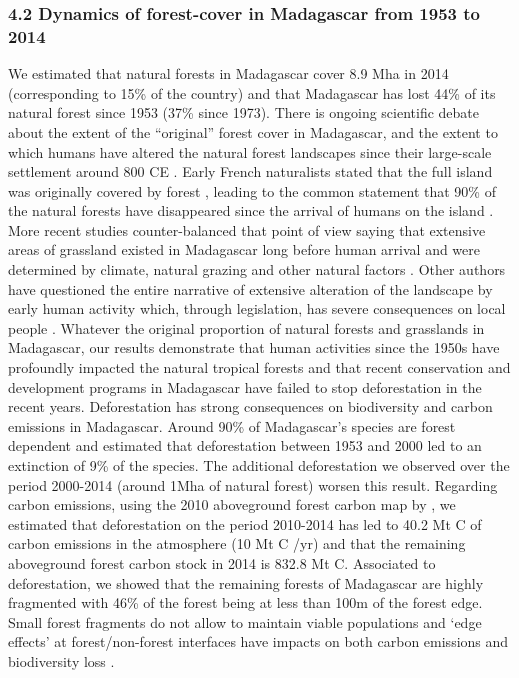 \documentclass[]{article}
\begin{document}
\hypertarget{dynamics-of-forest-cover-in-madagascar-from-1953-to-2014}{%
\subsubsection{4.2 Dynamics of forest-cover in Madagascar from 1953 to
2014}\label{dynamics-of-forest-cover-in-madagascar-from-1953-to-2014}}

We estimated that natural forests in Madagascar cover 8.9 Mha in 2014
(corresponding to 15\% of the country) and that Madagascar has lost 44\%
of its natural forest since 1953 (37\% since 1973). There is ongoing
scientific debate about the extent of the ``original'' forest cover in
Madagascar, and the extent to which humans have altered the natural
forest landscapes since their large-scale settlement around 800 CE
\citep{Burns2016, Cox2012}. Early French naturalists stated that the
full island was originally covered by forest
\citep{Humbert1927, Perrier1921}, leading to the common statement that
90\% of the natural forests have disappeared since the arrival of humans
on the island \citep{Kull2000}. More recent studies counter-balanced
that point of view saying that extensive areas of grassland existed in
Madagascar long before human arrival and were determined by climate,
natural grazing and other natural factors
\citep[\citet{Vorontsova2017}]{Virah-Sawmy2009}. Other authors have
questioned the entire narrative of extensive alteration of the landscape
by early human activity which, through legislation, has severe
consequences on local people \citep{Klein2002, Kull2000}. Whatever the
original proportion of natural forests and grasslands in Madagascar, our
results demonstrate that human activities since the 1950s have
profoundly impacted the natural tropical forests and that recent
conservation and development programs in Madagascar have failed to stop
deforestation in the recent years. Deforestation has strong consequences
on biodiversity and carbon emissions in Madagascar. Around 90\% of
Madagascar's species are forest dependent
\citep{Allnutt2008, Goodman2005} and \citet{Allnutt2008} estimated that
deforestation between 1953 and 2000 led to an extinction of 9\% of the
species. The additional deforestation we observed over the period
2000-2014 (around 1Mha of natural forest) worsen this result. Regarding
carbon emissions, using the 2010 aboveground forest carbon map by
\citet{Vieilledent2016}, we estimated that deforestation on the period
2010-2014 has led to 40.2 Mt C of carbon emissions in the atmosphere (10
Mt C /yr) and that the remaining aboveground forest carbon stock in 2014
is 832.8 Mt C. Associated to deforestation, we showed that the remaining
forests of Madagascar are highly fragmented with 46\% of the forest
being at less than 100m of the forest edge. Small forest fragments do
not allow to maintain viable populations and `edge effects' at
forest/non-forest interfaces have impacts on both carbon emissions
\citep{Brinck2017} and biodiversity loss \citep{Gibson2013, Murcia1995}.
\end{document}
